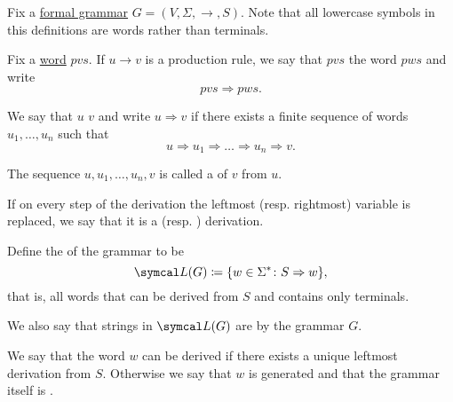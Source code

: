 \begin{definition}\label{def:grammar_derivation}
  Fix a \hyperref[def:grammar]{formal grammar} \( G = (V, \Sigma, \to, S) \). Note that all lowercase symbols in this definitions are words rather than terminals.

  \begin{DefEnum}
     Fix a \hyperref[def:language/word]{word} \( pvs \). If \( u \to v \) is a production rule, we say that \( pvs \)  the word \( pws \) and write
    \begin{equation*}
      pvs \Rightarrow pws.
    \end{equation*}

     We say that \( u \)  \( v \) and write \( u \Rightarrow v \) if there exists a finite sequence of words \( u_1, \ldots, u_n \) such that
    \begin{equation*}
      u \Rightarrow u_1 \Rightarrow \ldots \Rightarrow u_n \Rightarrow v.
    \end{equation*}

    The sequence \( u, u_1, \ldots, u_n, v \) is called a  of \( v \) from \( u \).

     If on every step of the derivation the leftmost (resp. rightmost) variable is replaced, we say that it is a  (resp. ) derivation.

     Define the  of the grammar to be
    \begin{equation*}
      \Cal{L}(G) \coloneqq \{ w \in \Sigma^* \colon S \Rightarrow w \},
    \end{equation*}
    that is, all words that can be derived from \( S \) and contains only terminals.

    We also say that strings in \( \Cal{L}(G) \) are  by the grammar \( G \).

    We say that the word \( w \) can be derived  if there exists a unique leftmost derivation from \( S \). Otherwise we say that \( w \) is generated  and that the grammar itself is .
  \end{DefEnum}
\end{definition}

